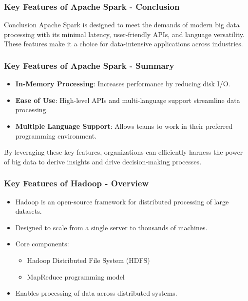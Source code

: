 \documentclass{beamer}
\begin{document}
\begin{frame}[fragile]
    \frametitle{Key Features of Apache Spark - Conclusion}
    \begin{block}{Conclusion}
        Apache Spark is designed to meet the demands of modern big data processing with its minimal latency, user-friendly APIs, and language versatility. These features make it a choice for data-intensive applications across industries.
    \end{block}
\end{frame}

\begin{frame}[fragile]
    \frametitle{Key Features of Apache Spark - Summary}
    \begin{itemize}
        \item \textbf{In-Memory Processing}: Increases performance by reducing disk I/O.
        \item \textbf{Ease of Use}: High-level APIs and multi-language support streamline data processing.
        \item \textbf{Multiple Language Support}: Allows teams to work in their preferred programming environment.
    \end{itemize}
    By leveraging these key features, organizations can efficiently harness the power of big data to derive insights and drive decision-making processes.
\end{frame}

\begin{frame}
    \frametitle{Key Features of Hadoop - Overview}
    \begin{itemize}
        \item Hadoop is an open-source framework for distributed processing of large datasets.
        \item Designed to scale from a single server to thousands of machines.
        \item Core components:  
        \begin{itemize}
            \item Hadoop Distributed File System (HDFS)
            \item MapReduce programming model
        \end{itemize}
        \item Enables processing of data across distributed systems.
    \end{itemize}
\end{frame}
\end{document}
